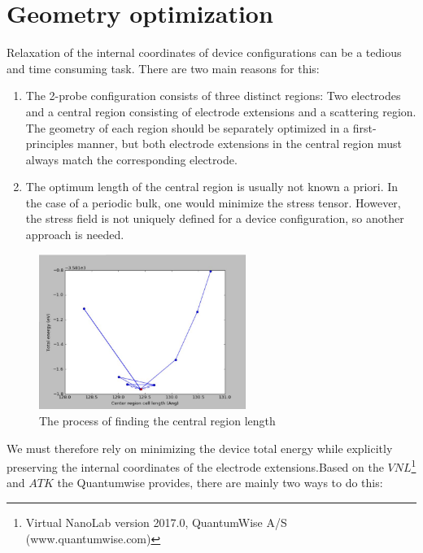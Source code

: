 \section*{Geometry optimization}
Relaxation of the internal coordinates of device configurations can be a tedious and time consuming task. There are two main reasons for this:
\begin{enumerate}
\item The 2-probe configuration consists of three distinct regions: Two electrodes and a central region consisting of electrode extensions and a scattering region. The geometry of each region should be separately optimized in a first-principles manner, but both electrode extensions in the central region must always match the corresponding electrode.
\item The optimum length of the central region is usually not known a priori. In the case of a periodic bulk, one would minimize the stress tensor. However, the stress field is not uniquely defined for a device configuration, so another approach is needed.
\end{enumerate}
\begin{figure}[htbp!] 
\centering    
\includegraphics[width=0.6\textwidth]{optimize}
\caption[optimize]{The process of finding the central region length}
\label{fig:optimize}
\end{figure}
We must therefore rely on minimizing the device total energy while explicitly preserving the internal coordinates of the electrode extensions.Based on the $VNL$\footnote{Virtual NanoLab version 2017.0, QuantumWise A/S (www.quantumwise.com)} and $ATK$\cite{ATK1,ATK2,ATK3,ATK4} the Quantumwise provides, there are mainly two ways to do this:
